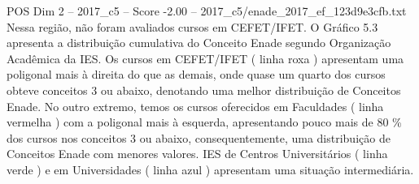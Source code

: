 \begin{textsample}{POS Dim 2 – 2017\_c5 – Score -2.00 – 2017\_c5/enade\_2017\_ef\_123d9e3cfb.txt}
Nessa região, não foram avaliados cursos em CEFET/IFET.
O Gráfico 5.3 apresenta a distribuição cumulativa do Conceito Enade segundo Organização Acadêmica da IES.
Os cursos em CEFET/IFET ( linha roxa ) apresentam uma poligonal mais à direita do que as demais, onde quase um quarto dos cursos obteve conceitos 3 ou abaixo, denotando uma melhor distribuição de Conceitos Enade.
No outro extremo, temos os cursos oferecidos em Faculdades ( linha vermelha ) com a poligonal mais à esquerda, apresentando pouco mais de 80 \% dos cursos nos conceitos 3 ou abaixo, consequentemente, uma distribuição de Conceitos Enade com menores valores.
IES de Centros Universitários ( linha verde ) e em Universidades ( linha azul ) apresentam uma situação intermediária.

\end{textsample}
